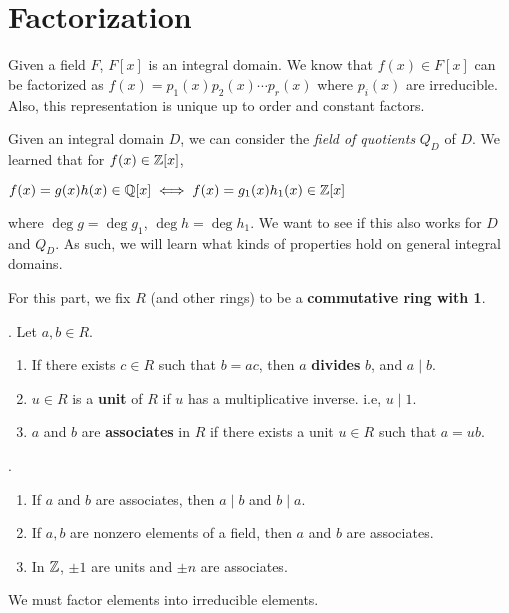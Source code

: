 \setcounter{chapter}{8}
\chapter{Factorization}

Given a field \(F\), \(F[x]\) is an integral domain. We know that \(f(x) \in F[x]\) can be factorized as \(f(x) = p_1(x)p_2(x) \cdots p_r(x)\) where \(p_i(x)\) are irreducible. Also, this representation is unique up to order and constant factors.

Given an integral domain \(D\), we can consider the \textit{field of quotients} \(Q_D\) of \(D\). We learned that for \(f(x) \in \mathbb{Z}[x]\),
\begin{center}
    \(f(x) = g(x)h(x) \in \mathbb{Q}[x] \iff f(x) = g_1(x)h_1(x) \in \mathbb{Z}[x]\)
\end{center}
where \(\deg g = \deg g_1\), \(\deg h = \deg h_1\). We want to see if this also works for \(D\) and \(Q_D\). As such, we will learn what kinds of properties hold on general integral domains.

\medskip

For this part, we fix \(R\) (and other rings) to be a \textbf{commutative ring with 1}.

\setcounter{topic}{44}

. Let \(a, b \in R\).
\begin{enumerate}
    \item If there exists \(c \in R\) such that \(b = ac\), then \(a\) \textbf{divides} \(b\), and \(a \mid b\).
    \item \(u \in R\) is a \textbf{unit} of \(R\) if \(u\) has a multiplicative inverse. i.e, \(u \mid 1\).
    \item \(a\) and \(b\) are \textbf{associates} in \(R\) if there exists a unit \(u \in R\) such that \(a = ub\).
\end{enumerate}

\ex.
\begin{enumerate}
    \item If \(a\) and \(b\) are associates, then \(a \mid b\) and \(b \mid a\).
    \item If \(a, b\) are nonzero elements of a field, then \(a\) and \(b\) are associates.
    \item In \(\mathbb{Z}\), \(\pm 1\) are units and \(\pm n\) are associates.
\end{enumerate}

We must factor elements into irreducible elements.

